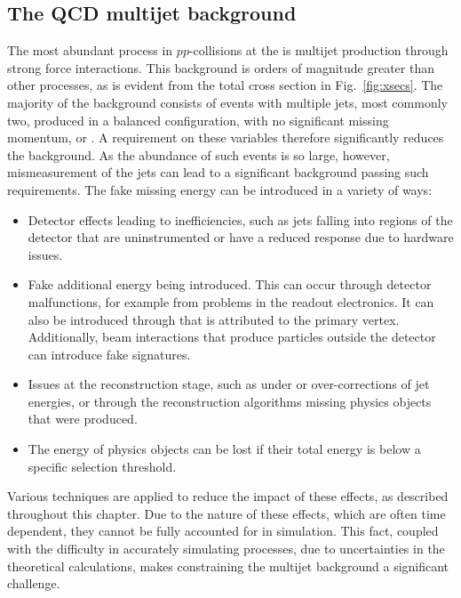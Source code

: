 \subsection{The QCD multijet background}
\label{sec:qcdMultijet}

The most abundant \SM process in $pp$-collisions at the \LHC is \QCD
multijet production through strong force interactions. This background
is orders of magnitude greater than other processes, as is evident
from the total \LHC cross section in Fig.~\ref{fig:xsecs}. The
majority of the \QCD background consists of events with multiple jets,
most commonly two, produced in a balanced configuration, with no
significant missing momentum, \MET or \MHT. A requirement on these
variables therefore significantly reduces the background. As
the abundance of such events is so large, however, mismeasurement of
the jets can lead to a significant \QCD background passing such
requirements. The fake missing energy can be introduced in a variety
of ways:
\begin{itemize}
\item{Detector effects leading to inefficiencies, such as jets
falling into regions of the detector that are uninstrumented or have a
reduced response due to hardware issues.}
\item{Fake additional energy being introduced. This can occur through
detector malfunctions, for example from problems in the readout
electronics. It can also be introduced through \PU that is attributed to
the primary vertex. Additionally, beam interactions that produce
particles outside the detector can introduce fake \MET signatures.}
\item{Issues at the reconstruction stage,
such as under or over-corrections of jet energies, or through
the reconstruction algorithms missing physics objects that were
produced.}
\item{The energy of physics objects can be lost if their total energy
is below a specific selection threshold. }
\end{itemize}

Various techniques are applied to reduce the impact of these
effects, as described throughout this chapter. Due to the nature of
these effects, which are often time dependent, they cannot be fully
accounted for in simulation. This fact, coupled with the difficulty in
accurately simulating \QCD processes, due to uncertainties in the
theoretical calculations, makes constraining the multijet background a
significant challenge. 

